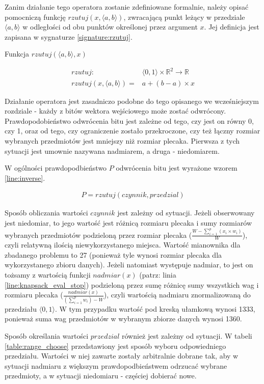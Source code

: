 \documentclass[twoside]{iisthesis}
\newcommand{\numberSet}[1]{\mathbb{#1}}
\newcommand{\range}[2]{\langle#1, #2\rangle}
\begin{document}
Zanim działanie tego operatora zostanie zdefiniowane formalnie, należy opisać pomocniczą funkcję $rzutuj(x, \range{a}{b})$, zwracającą punkt leżący w przedziale $\range{a}{b}$ w odległości od obu punktów określonej przez argument $x$.
Jej definicja jest zapisana w sygnaturze \ref{signature:rzutuj}.

\begin{signature}
	\caption{Funkcja $rzutuj(\range{a}{b}, x)$ \label{signature:rzutuj}}
	\begin{align}
		rzutuj: &\range{0}{1} \times \numberSet{R}^2 \rightarrow \numberSet{R} \\
		rzutuj(x, \range{a}{b}) =& a + (b-a) \times x
	\end{align}
\end{signature}

Działanie operatora jest zasadniczo podobne do tego opisanego we wcześniejszym rozdziale - każdy z bitów wektora wejściowego może zostać odwrócony.
Prawdopodobieństwo odwrócenia bitu jest zależne od tego, czy jest on równy 0, czy 1, oraz od tego, czy ograniczenie zostało przekroczone, czy też łączny rozmiar wybranych przedmiotów jest mniejszy niż rozmiar plecaka.
Pierwsza z tych sytuacji jest umownie nazywana nadmiarem, a druga - niedomiarem.

W ogólności prawdopodbieństwo $P$ odwrócenia bitu jest wyrażone wzorem \ref{line:inverse}.

\begin{align}
	\label{line:inverse}
	P = rzutuj(czynnik, przedzial)
\end{align}

Sposób obliczania wartości $czynnik$ jest zależny od sytuacji. 
Jeżeli obserwowany jest niedomiar, to jego wartość jest różnicą rozmiaru plecaka i sumy rozmiarów wybranych przedmiotów podzieloną przez rozmiar plecaka ($\frac{W - \sum_{i=1}^p (x_i \times w_i)}{W}$), czyli relatywną ilością niewykorzystanego miejsca. Wartość mianownika dla zbadanego problemu to 27 (ponieważ tyle wynosi rozmiar plecaka dla wykorzystanego zbioru danych).
Jeżeli natomiast występuje nadmiar, to jest on tożsamy z wartością funkcji $nadmiar(x)$ (patrz: linia \ref{line:knapsack_eval_stop}) podzieloną przez sumę różnicę sumy wszystkich wag i rozmiaru plecaka ($\frac{nadmiar(x)}{(\sum_{i=1}^p w_i) - W}$), czyli wartością nadmiaru znormalizowaną do przedziału $\range{0}{1}$.
W tym przypadku wartość pod kreską ułamkową wynosi 1333, ponieważ suma wag przedmiotów w wybranym zbiorze danych wynosi 1360.

Sposób określania wartości $przedzial$ również jest zależny od sytuacji. 
W tabeli \ref{table:range_choose} przedstawiony jest sposób wyboru odpowiedniego przedziału. 
Wartości w niej zawarte zostały arbitralnie dobrane tak, aby w sytuacji nadmiaru z większym prawdopodbieństwem odrzucać wybrane przedmioty, a w sytuacji niedomiaru - częściej dobierać nowe.
\end{document}
